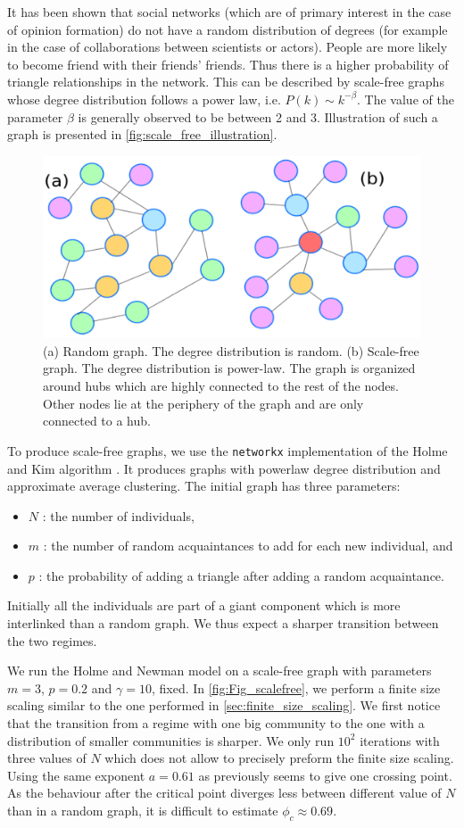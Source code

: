 \documentclass[11pt]{article}
\begin{document}
It has been shown that social networks (which are of primary interest in the case of opinion formation) do not have a random distribution of degrees (for example in the case of collaborations between scientists or actors). People are more likely to become friend with their friends' friends. Thus there is a higher probability of triangle relationships in the network. This can be described by scale-free graphs whose degree distribution follows a power law, i.e. $P(k) \sim k^{- \beta} $. The value of the parameter $\beta$ is generally observed to be between 2 and 3. Illustration of such a graph is presented in \autoref{fig:scale_free_illustration}.
\begin{figure}
    \centering
    \includegraphics[width = 0.6\linewidth]{figures/Scalefree_graph.PNG}
    \caption{(a) Random graph. The degree distribution is random. (b) Scale-free graph. The degree distribution is power-law. The graph is organized around hubs which are highly connected to the rest of the nodes. Other nodes lie at the periphery of the graph and are only connected to a hub.}
    \label{fig:scale_free_illustration}
\end{figure}

To produce scale-free graphs, we use the \texttt{networkx} implementation of the Holme and Kim algorithm \citep{Holme2002}. It produces graphs with powerlaw degree distribution and approximate average clustering. The initial graph has three parameters: 
\begin{itemize}
    \item $N$ : the number of individuals,
    \item $m$ : the number of random acquaintances to add for each new individual, and
    \item $p$ : the probability of adding a triangle after adding a random acquaintance.
\end{itemize}
Initially all the individuals are part of a giant component which is more interlinked than a random graph. We thus expect a sharper transition between the two regimes.

We run the Holme and Newman model on a scale-free graph with parameters $m=3$, $p=0.2$ and $\gamma=10$, fixed. In \autoref{fig:Fig_scalefree}, we perform a finite size scaling similar to the one performed in \autoref{sec:finite_size_scaling}. We first notice that the transition from a regime with one big community to the one with a distribution of smaller communities is sharper.  We only run $10^2$ iterations with three values of $N$ which does not allow to precisely preform the finite size scaling. Using the same exponent $a=0.61$ as previously seems to give one crossing point. As the behaviour after the critical point diverges less between different value of $N$ than in a random graph, it is difficult to estimate $\phi_c\approx 0.69$. 
\end{document}
